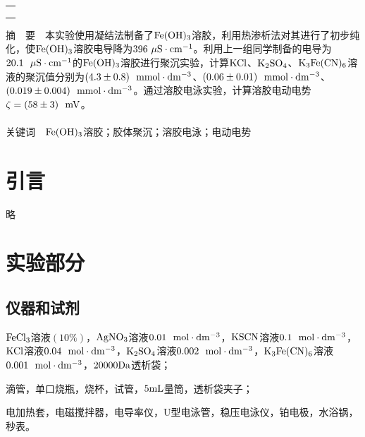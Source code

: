 \documentclass[12pt]{article}
\begin{document}
\begin{titlepage}
\begin{center}
            \begin{tabular*}{\textwidth}{c}
                \\ %
                \\ %
                \\ %
                \\ %
                \hline %
            \end{tabular*}
        \end{center}
        \textsf{摘\ \ 要}\ \ 本实验使用凝结法制备了$\rm Fe(OH)_{3}$溶胶，利用热渗析法对其进行了初步纯化，使$\rm Fe(OH)_{3}$溶胶电导降为$396\  {\rm \mu S\cdot cm^{-1}}$。利用上一组同学制备的电导为$20.1\ \ {\rm \mu S\cdot cm^{-1}}$的$\rm Fe(OH)_{3}$溶胶进行聚沉实验，计算$\rm KCl$、$\rm K_{2}SO_{4}$、$\rm K_{3}Fe(CN)_{6}$溶液的聚沉值分别为$(4.3\pm 0.8)\ \ {\rm mmol\cdot dm^{-3}}$、$(0.06\pm 0.01)\ \ {\rm mmol\cdot dm^{-3}}$、$(0.019\pm 0.004)\ \ {\rm mmol\cdot dm^{-3}}$。通过溶胶电泳实验，计算溶胶电动电势$\zeta=(58\pm 3)\ \ {\rm mV}$。
        \\
        \\
        \textsf{关键词}\ \ $\rm Fe(OH)_{3}$溶胶；胶体聚沉；溶胶电泳；电动电势
    \end{titlepage}

    \section{引言}
	略
               
\vbox{}        
    \section{实验部分}
    	\subsection{仪器和试剂}
    	$\rm FeCl_{3}$溶液$(10\%)$，$\rm AgNO_{3}$溶液$0.01\ \ {\rm mol\cdot dm^{-3}}$，$\rm KSCN$溶液$0.1\ \ {\rm mol\cdot dm^{-3}}$，$\rm KCl$溶液$0.04\ \ {\rm mol\cdot dm^{-3}}$，$\rm K_{2}SO_{4}$溶液$0.002\ \ {\rm mol\cdot dm^{-3}}$，$\rm K_{3}Fe(CN)_{6}$溶液$0.001\ \ {\rm mol\cdot dm^{-3}}$，$\rm 20000Da$透析袋；\par 
    	滴管，单口烧瓶，烧杯，试管，$\rm 5 mL$量筒，透析袋夹子；\par 
    	电加热套，电磁搅拌器，电导率仪，U型电泳管，稳压电泳仪，铂电极，水浴锅，秒表。
    
\end{document}
